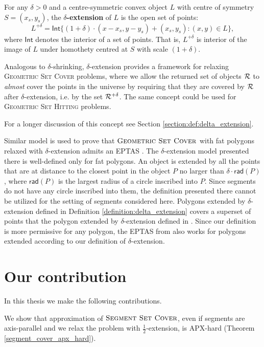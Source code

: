 \newcommand{\Int}{\mathsf{Int}}
\begin{defi}
\label{definition:delta_extension}
For any $\delta > 0$ and a centre-symmetric convex object $L$ with
centre of symmetry $S = (x_s, y_s)$,
the \textbf{$\delta$-extension} of $L$ is the open set of points:
$$L^{+\delta} = \Int\{(1 + \delta)\cdot(x - x_s, y - y_s) + (x_s, y_s) : (x, y) \in L\},$$
where $\Int$ denotes the interior of a set of points.
That is, $L^{+\delta}$ is interior of the image of $L$ under homothety centred
at $S$ with scale $(1+\delta)$.
\end{defi}

Analogous to $\delta$-shrinking,
$\delta$-extension provides a framework for relaxing
\textsc{Geometric} \textsc{Set} \textsc{Cover} problems, where we allow the returned set of
objects $\mathcal{R}$ to \textit{almost} cover the points in the universe
by requiring that they are covered by $\mathcal{R}$ after $\delta$-extension,
i.e. by the set $\mathcal{R}^{+\delta}$.
The same concept could be used for \textsc{Geometric Set Hitting} problems.
 
For a longer discussion of this concept see Section
\ref{section:def:delta_extension}.

Similar model is used to prove that $\textsc{Geometric Set Cover}$ with fat polygons
relaxed with $\delta$-extension admits an EPTAS \cite{harpeled12}.
The $\delta$-extension model presented there is well-defined only
for fat polygons. An object is extended by all the points that
are at distance to the closest point in the object $P$
no larger than $\delta\cdot \mathsf{rad}(P)$, where $\mathsf{rad}(P)$
is the largest radius of a circle inscribed into $P$.
Since segments do not have any circle inscribed into them,
the definition presented there cannot be utilized
for the setting of segments considered here.
Polygons extended by $\delta$-extension
defined in Definition \ref{definition:delta_extension}
covers a superset of points that the polygon extended
by $\delta$-extension defined in \cite{harpeled12}.
Since our definition is more permissive for any polygon,
the EPTAS from \cite{harpeled12}
also works for polygons extended
according to our definition of $\delta$-extension.

\section{Our contribution}
In this thesis we make the following contributions.

We show that approximation of $\textsc{Segment Set Cover}$,
even if segments are axis-parallel and we relax the problem with  $\frac{1}{2}$-extension,
is APX-hard (Theorem \ref{segment_cover_apx_hard}).

